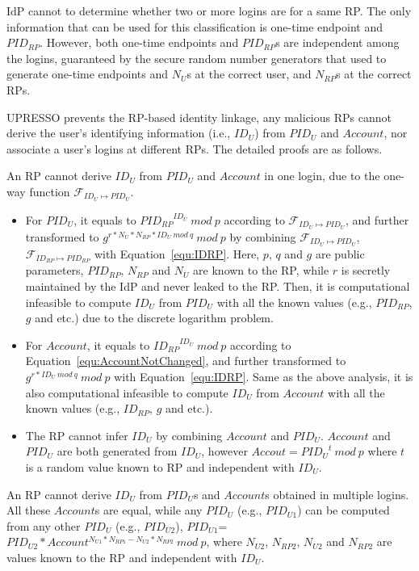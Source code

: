 IdP cannot to determine whether two or more logins are for a same RP. The only information that can be used for this classification is one-time endpoint and $PID_{RP}$. However, both one-time endpoints and $PID_{RP}$s are independent among the logins, guaranteed by the secure random number generators that used to generate one-time endpoints and $N_{U}$s at the correct user, and $N_{RP}$s at the correct RPs.

UPRESSO prevents the RP-based identity linkage, any malicious RPs cannot derive the user's identifying information (i.e., $ID_U$) from $PID_U$ and $Account$, nor associate a user's logins at different RPs.
The detailed proofs are as follows.

An RP cannot derive $ID_U$ from $PID_U$ and $Account$ in one login, due to the one-way function $\mathcal{F}_{ID_{U} \mapsto PID_{U}}$.
\begin{itemize}
  \item For $PID_U$, it equals to ${PID_{RP}}^{ID_U}\ mod\ p$ according to $\mathcal{F}_{ID_{U} \mapsto PID_{U}}$, and further transformed to $g^{r*N_U*N_{RP}*ID_U\ mod\ q}\ mod\ p$ by combining $\mathcal{F}_{ID_{U} \mapsto PID_{U}}$, $\mathcal{F}_{ID_{RP} \mapsto PID_{RP}}$ with Equation~\ref{equ:IDRP}.
      Here, $p$, $q$ and $g$ are public parameters, $PID_{RP}$, $N_{RP}$ and $N_U$ are known to the RP, while $r$ is secretly maintained by the IdP and never leaked to the RP.
      Then, it is computational infeasible to compute $ID_U$ from $PID_U$ with all the known values (e.g., $PID_{RP}$, $g$ and etc.) due to the discrete logarithm problem.
  \item For $Account$, it equals to ${ID_{RP}}^{ID_U}\ mod\ p$ according to Equation~\ref{equ:AccountNotChanged}, and further transformed to $g^{r*ID_U\ mod\ q}\ mod\ p$ with Equation~\ref{equ:IDRP}. Same as the above analysis, it is also computational infeasible to compute $ID_U$ from $Account$ with all the known values (e.g., $ID_{RP}$, $g$ and etc.).
  \item The RP cannot infer $ID_U$ by combining $Account$ and $PID_U$.
        $Account$ and $PID_U$ are both generated from $ID_U$, however $Accout={PID_U}^t\ mod\ p$ where $t$ is a random value known to RP and independent with $ID_U$.
\end{itemize}

An RP cannot derive $ID_U$ from $PID_U$s and $Account$s obtained in multiple logins. All these $Account$s are equal,  while any $PID_{U}$ (e.g., $PID_{U1}$) can be computed from any other $PID_{U}$ (e.g., $PID_{U2}$),  $PID_{U1}$=$PID_{U2} * Account^{N_{U1}*N_{RP1}-N_{U2}*N_{RP2}}\ mod\ p$, where $N_{U2}$, $N_{RP2}$, $N_{U2}$ and $N_{RP2}$ are values known to the RP and independent with $ID_U$.

